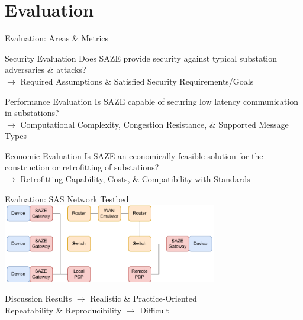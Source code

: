 \documentclass[en]{sdqbeamer}
\begin{document}
\section{Evaluation}
\begin{frame}{Evaluation: Areas \& Metrics}
    \begin{greenblock}{Security Evaluation}
        Does SAZE provide security against typical substation adversaries \& attacks?
        \\$\rightarrow$ Required Assumptions \& Satisfied Security Requirements/Goals
    \end{greenblock}
    \begin{greenblock}{Performance Evaluation}
        Is SAZE capable of securing low latency communication in substations?
        \\$\rightarrow$ Computational Complexity, Congestion Resistance, \& Supported Message Types
    \end{greenblock}
    \begin{greenblock}{Economic Evaluation}
        Is SAZE an economically feasible solution for the construction or retrofitting of substations?
        \\$\rightarrow$ Retrofitting Capability, Costs, \& Compatibility with Standards
    \end{greenblock}
\end{frame}

\begin{frame}{Evaluation: SAS Network Testbed}
    \centering
    \includegraphics[width=0.7\textwidth]{./figures/network_testbed_color.drawio.pdf}
    \begin{blueblock}{Discussion}
        Results $\rightarrow$ Realistic \& Practice-Oriented 
        \\Repeatability \& Reproducibility $\rightarrow$ Difficult
    \end{blueblock}
\end{frame}
\end{document}
